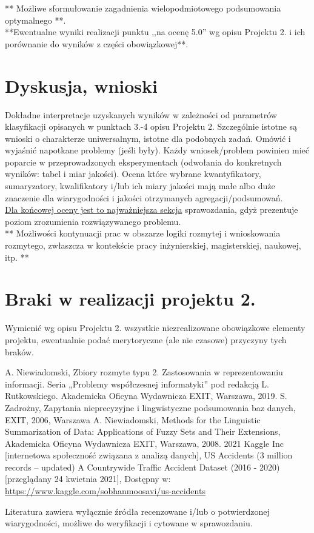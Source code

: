 \documentclass{classrep}
\begin{document}
** Możliwe sformułowanie zagadnienia wielopodmiotowego podsumowania optymalnego **.\\

{**Ewentualne wyniki realizacji punktu ,,na ocenę 5.0'' wg opisu Projektu 2. i ich porównanie do wyników z
części obowiązkowej**.}\\



\section{Dyskusja, wnioski}
Dokładne interpretacje uzyskanych wyników w zależności od parametrów klasyfikacji
opisanych w punktach 3.-4 opisu Projektu 2. 
Szczególnie istotne są wnioski o charakterze uniwersalnym, istotne dla podobnych zadań. 
Omówić i wyjaśnić napotkane problemy (jeśli były). Każdy wniosek/problem powinien mieć poparcie
w przeprowadzonych eksperymentach (odwołania do konkretnych wyników: tabel i miar
jakości). Ocena które wybrane kwantyfikatory, sumaryzatory, kwalifikatory i/lub ich
miary jakości mają małe albo duże znaczenie dla wiarygodności i jakości otrzymanych
agregacji/podsumowań.  \\
\underline{Dla końcowej oceny jest to najważniejsza sekcja} sprawozdania, gdyż prezentuje poziom
zrozumienia rozwiązywanego problemu.\\

** Możliwości kontynuacji prac w obszarze logiki rozmytej i wnioskowania rozmytego, zwłaszcza w kontekście pracy inżynierskiej,
magisterskiej, naukowej, itp. **\\



\section{Braki w realizacji projektu 2.}
Wymienić wg opisu Projektu 2. wszystkie niezrealizowane obowiązkowe elementy projektu, ewentualnie
podać merytoryczne (ale nie czasowe) przyczyny tych braków. 


\begin{thebibliography}{99}
  A. Niewiadomski, Zbiory rozmyte typu 2. Zastosowania w reprezentowaniu informacji.  Seria „Problemy współczesnej informatyki” pod redakcją L. Rutkowskiego. Akademicka Oficyna Wydawnicza EXIT, Warszawa, 2019.
 S. Zadrożny, Zapytania nieprecyzyjne i lingwistyczne podsumowania baz danych, EXIT, 2006, Warszawa
 A. Niewiadomski, Methods for the Linguistic Summarization of Data: Applications of Fuzzy Sets and Their Extensions, Akademicka Oficyna Wydawnicza EXIT, Warszawa, 2008.
 2021 Kaggle Inc [internetowa społeczność związana z analizą danych], US Accidents (3 million records -- updated)
A Countrywide Traffic Accident Dataset (2016 - 2020) [przeglądany 24 kwietnia 2021], Dostępny w: \url{https://www.kaggle.com/sobhanmoosavi/us-accidents}
\end{thebibliography}

Literatura zawiera wyłącznie źródła recenzowane i/lub o potwierdzonej wiarygodności,
możliwe do weryfikacji i cytowane w sprawozdaniu. 
\end{document}
